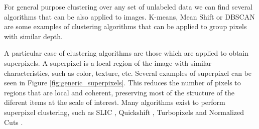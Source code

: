 For general purpose clustering over any set of unlabeled data we can find several algorithms that can be also applied to images. K-means, Mean Shift \cite{comaniciu2002mean} or DBSCAN \cite{ester1996density} are some examples of clustering algorithms that can be applied to group pixels with similar depth.

A particular case of clustering algorithms are those which are applied to obtain superpixels. A superpixel  is a local region of the image with similar characteristics, such as color, texture, etc. Several examples of superpixel can be seen in Figure \ref{fig:generic_superpixels}. This reduces the number of pixels to regions that are local and coherent, preserving most of the structure of the diferent items at the scale of interest. Many algorithms exist to perform superpixel clustering, such as SLIC \cite{achanta2010slic}, Quickshift \cite{vedaldi2008quick}, Turbopixels \cite{levinshtein2009turbopixels} and Normalized Cuts \cite{mori2005guiding}.




